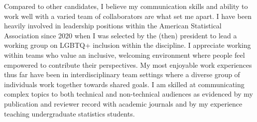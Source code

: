 \documentclass[11pt,a4paper,sans]{moderncv}
\begin{document}
		Compared to other candidates, I believe my communication skills and ability to work well with a varied team of collaborators are what set me apart. I have been heavily involved in leadership positions within the American Statistical Association since 2020 when I was selected by the (then) president to lead a working group on LGBTQ+ inclusion within the discipline. I appreciate working within teams who value an inclusive, welcoming environment where people feel empowered to contribute their perspectives. My most enjoyable work experiences thus far have been in interdisciplinary team settings where a diverse group of individuals work together towards shared goals. I am skilled at communicating complex topics to both technical and non-technical audiences as evidenced by my publication and reviewer record with academic journals and by my experience teaching undergraduate statistics students.

	
	
	\makeletterclosing
	
\end{document}
